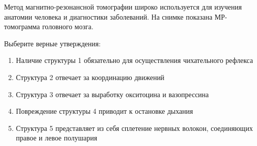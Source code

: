 
Метод
магнитно-резонансной томографии широко используется для изучения анатомии
человека и диагностики заболеваний. На снимке показана МР-томограмма головного
мозга.


Выберите
верные утверждения:

\begin{enumerate}
    \item Наличие структуры 1 обязательно для осуществления чихательного рефлекса
    \item Структура 2 отвечает за координацию движений
    \item Структура 3 отвечает за выработку окситоцина и вазопрессина
    \item Повреждение структуры 4 приводит к остановке дыхания
    \item Структура 5 представляет из себя сплетение нервных волокон, соединяющих правое и левое полушария 
\end{enumerate}
 
\explanationSection

